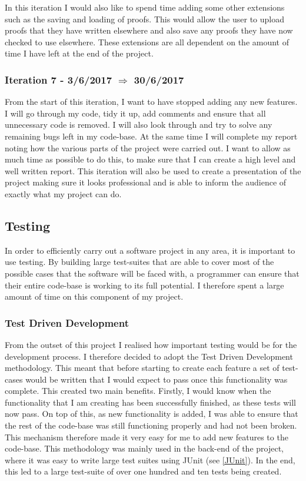 In this iteration I would also like to spend time adding some other extensions such as the saving and loading of proofs. This would allow the user to upload proofs that they have written elsewhere and also save any proofs they have now checked to use elsewhere. These extensions are all dependent on the amount of time I have left at the end of the project.

\subsubsection{Iteration 7 - 3/6/2017 $\Rightarrow$ 30/6/2017}

From the start of this iteration, I want to have stopped adding any new features. I will go through my code, tidy it up, add comments and ensure that all unnecessary code is removed. I will also look through and try to solve any remaining bugs left in my code-base. At the same time I will complete my report noting how the various parts of the project were carried out. I want to allow as much time as possible to do this, to make sure that I can create a high level and well written report. This iteration will also be used to create a presentation of the project making sure it looks professional and is able to inform the audience of exactly what my project can do.

\subsection{Testing \label{testing}}

In order to efficiently carry out a software project in any area, it is important to use testing. By building large test-suites that are able to cover most of the possible cases that the software will be faced with, a programmer can ensure that their entire code-base is working to its full potential. I therefore spent a large amount of time on this component of my project.

\subsubsection{Test Driven Development}
From the outset of this project I realised how important testing would be for the development process. I therefore decided to adopt the Test Driven Development methodology. This meant that before starting to create each feature a set of test-cases would be written that I would expect to pass once this functionality was complete. This created two main benefits. Firstly, I would know when the functionality that I am creating has been successfully finished, as these tests will now pass. On top of this, as new functionality is added, I was able to ensure that the rest of the code-base was still functioning properly and had not been broken. This mechanism therefore made it very easy for me to add new features to the code-base. This methodology was mainly used in the back-end of the project, where it was easy to write large test suites using JUnit (see \ref{JUnit}). In the end, this led to a large test-suite of over one hundred and ten tests being created. 

